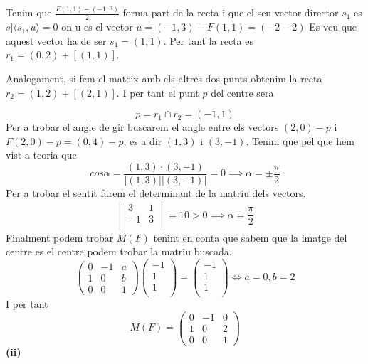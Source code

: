 \documentclass[12pt, a4papre]{article}
\newcommand{\norm}[1]{\lvert #1 \rvert}
\begin{document}
	Tenim que $\frac{F(1,1)-(-1,3)}{2}$ forma part de la recta i que el seu vector director $s_1$ es $s|\langle s_1, u\rangle=0$ on u es el vector $u=(-1,3)-F(1,1)=(-2-2)$
	Es veu que aquest vector ha de ser $s_1=(1,1)$. Per tant la recta es $r_1=(0,2)+[(1,1)]$. 
	
	Analogament, si fem el mateix amb els altres dos punts obtenim la recta $r_2=(1,2)+[(2,1)]$. I per tant el punt $p$ del centre sera
	
	\[
	p=r_1\cap r_2 = (-1,1)
	\]
	Per a trobar el angle de gir buscarem el angle entre els vectors $(2,0)-p$ i $F(2,0)-p=(0,4)-p$, es a dir $(1,3)$ i $(3,-1)$. Tenim que pel que hem vist a teoria que
	\[
	cos\alpha=\frac{(1,3)\cdot(3,-1)}{\norm{(1,3)}\norm{(3,-1)}}=0 \implies \alpha=\pm\frac{\pi}{2} 
	\]
	Per a trobar el sentit farem el determinant de la matriu dels vectors.
	\[
	\begin{vmatrix}
			3 &	1\\
			-1  & 3\\
	\end{vmatrix}
	=10 > 0 \implies \alpha=\frac{\pi}{2}
	\]
	Finalment podem trobar $M(F)$ tenint en conta que sabem que la imatge del centre es el centre podem trobar la matriu buscada.
	\[
	\begin{pmatrix}
		0 &	-1	& a\\
		1  & 0	& b\\
		0    & 0	& 1 
	\end{pmatrix}
	\begin{pmatrix}
		-1\\
		1\\
		1 \\
	\end{pmatrix}
	=
	\begin{pmatrix}
		-1\\
		1\\
		1 \\
	\end{pmatrix}
	\iff
	a=0, b=2
	\]
	I per tant
	\[
	M(F)=
	\begin{pmatrix}
		0 &	-1	& 0\\
		1  & 0	& 2\\
		0    & 0	& 1 
	\end{pmatrix}
	\]
	\newpage
	\textbf{(ii)} 
\end{document}
